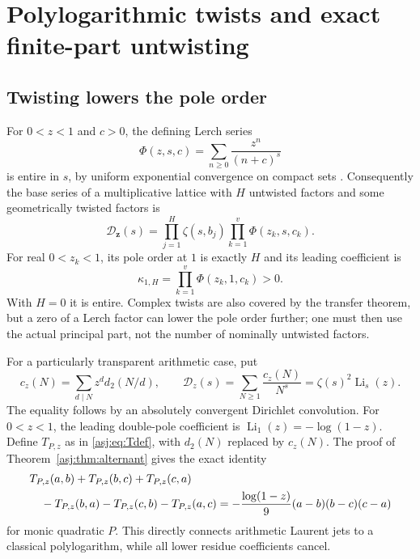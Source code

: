 \documentclass[11pt]{article}
\numberwithin{equation}{section}
\theoremstyle{definition}\newtheorem{definition}[theorem]{Definition}
\theoremstyle{remark}\newtheorem{remark}[theorem]{Remark}\newtheorem{example}[theorem]{Example}
\newcommand{\D}{\mathscr D}\newcommand{\calH}{\mathcal H}\newcommand{\calR}{\mathcal R}
\DeclareMathOperator{\Li}{Li}\DeclareMathOperator{\FP}{FP}\DeclareMathOperator{\Res}{Res}
\begin{document}


\section{Polylogarithmic twists and exact finite-part untwisting}
\label{asj:sec:twists}

\subsection{Twisting lowers the pole order}
For $0<z<1$ and $c>0$, the defining Lerch series
\[
 \Phi(z,s,c)=\sum_{n\ge0}\frac{z^n}{(n+c)^s}
\]
is entire in $s$, by uniform exponential convergence on compact sets
\cite{dlmf-lerch}. Consequently the base series of a multiplicative lattice
with $H$ untwisted factors and some geometrically twisted factors is
\begin{equation}\label{asj:eq:twistedbase}
 \D_{\boldsymbol z}(s)=
      \prod_{j=1}^H\zeta(s,b_j)\prod_{k=1}^v\Phi(z_k,s,c_k).
\end{equation}
For real $0<z_k<1$, its pole order at $1$ is exactly $H$ and its leading
coefficient is
\[
 \kappa_{1,H}=\prod_{k=1}^v\Phi(z_k,1,c_k)>0.
\]
With $H=0$ it is entire. Complex twists are also covered by the transfer
theorem, but a zero of a Lerch factor can lower the pole order further;
one must then use the actual principal part, not the number of nominally
untwisted factors.

For a particularly transparent arithmetic case, put
\begin{equation}\label{asj:eq:cz}
 c_z(N)=\sum_{d\mid N}z^d d_2(N/d),\qquad
 \D_z(s)=\sum_{N\ge1}\frac{c_z(N)}{N^s}
                         =\zeta(s)^2\Li_s(z).
\end{equation}
The equality follows by an absolutely convergent Dirichlet convolution.
For $0<z<1$, the leading double-pole coefficient is
$\Li_1(z)=-\log(1-z)$. Define $T_{P,z}$ as in \eqref{asj:eq:Tdef}, with
$d_2(N)$ replaced by $c_z(N)$. The proof of Theorem~\ref{asj:thm:alternant}
gives the exact identity
\begin{align}\label{asj:eq:twisted-six}
 &T_{P,z}(a,b)+T_{P,z}(b,c)+T_{P,z}(c,a)\notag\\
 &\quad-T_{P,z}(b,a)-T_{P,z}(c,b)-T_{P,z}(a,c)
    =-\frac{\log(1-z)}9(a-b)(b-c)(c-a)
\end{align}
for monic quadratic $P$. This directly connects arithmetic Laurent jets
to a classical polylogarithm, while all lower residue coefficients cancel.
\end{document}
